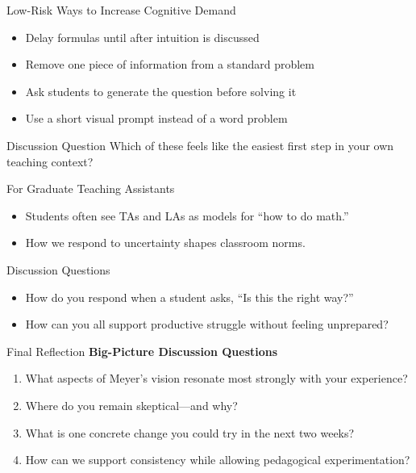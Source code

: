 \documentclass{beamer}
\begin{document}
\begin{frame}{Low-Risk Ways to Increase Cognitive Demand}
  \begin{itemize}
    \item Delay formulas until after intuition is discussed
    \item Remove one piece of information from a standard problem
    \item Ask students to generate the question before solving it
    \item Use a short visual prompt instead of a word problem
  \end{itemize}
  
  \begin{block}{Discussion Question}
    Which of these feels like the easiest first step in your own teaching context?
  \end{block}
\end{frame}

\begin{frame}{For Graduate Teaching Assistants}
  \begin{itemize}
    \item Students often see TAs and LAs as models for “how to do math.”
    \item How we respond to uncertainty shapes classroom norms.
  \end{itemize}
  
  \begin{block}{Discussion Questions}
    \begin{itemize}
      \item How do you respond when a student asks, “Is this the right way?”
      \item How can you all support productive struggle without feeling unprepared?
    \end{itemize}
  \end{block}
\end{frame}

\begin{frame}{Final Reflection}
  \textbf{Big-Picture Discussion Questions}
  \begin{enumerate}
    \item What aspects of Meyer’s vision resonate most strongly with your experience?
    \item Where do you remain skeptical—and why?
    \item What is one concrete change you could try in the next two weeks?
    \item How can we support consistency while allowing pedagogical experimentation?
  \end{enumerate}
\end{frame}
\end{document}
